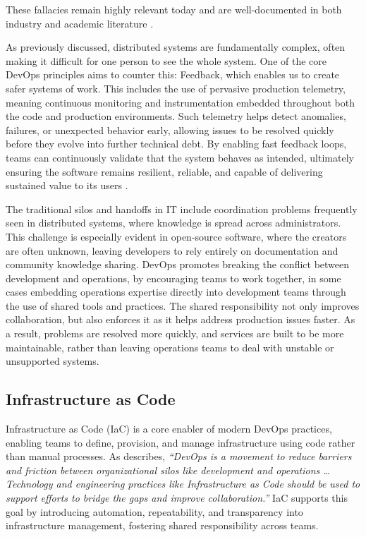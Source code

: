 These fallacies remain highly relevant today and are well-documented in both industry and academic literature \citep{rotemgaloz_fallacies}.

As previously discussed, distributed systems are fundamentally complex, often making it difficult for one person to see the whole system. One of the core DevOps principles aims to counter this: Feedback, which enables us to create safer systems of work. This includes the use of pervasive production telemetry, meaning continuous monitoring and instrumentation embedded throughout both the code and production environments. Such telemetry helps detect anomalies, failures, or unexpected behavior early, allowing issues to be resolved quickly before they evolve into further technical debt. By enabling fast feedback loops, teams can continuously validate that the system behaves as intended, ultimately ensuring the software remains resilient, reliable, and capable of delivering sustained value to its users \citep{kim2016devops}.

The traditional silos and handoffs in IT include coordination problems frequently seen in distributed systems, where knowledge is spread across administrators. This challenge is especially evident in open-source software, where the creators are often unknown, leaving developers to rely entirely on documentation and community knowledge sharing. DevOps promotes breaking the conflict between development and operations, by encouraging teams to work together, in some cases embedding operations expertise directly into development teams through the use of shared tools and practices. The shared responsibility not only improves collaboration, but also enforces it as it helps address production issues faster. As a result, problems are resolved more quickly, and services are built to be more maintainable, rather than leaving operations teams to deal with unstable or unsupported systems.


\subsection{Infrastructure as Code}\label{sectionIaC}
Infrastructure as Code (IaC) is a core enabler of modern DevOps practices, enabling teams to define, provision, and manage infrastructure using code rather than manual processes. As \cite{morris_2020} describes, \textit{“DevOps is a movement to reduce barriers and friction between organizational silos like development and operations … Technology and engineering practices like Infrastructure as Code should be used to support efforts to bridge the gaps and improve collaboration.”} IaC supports this goal by introducing automation, repeatability, and transparency into infrastructure management, fostering shared responsibility across teams.

